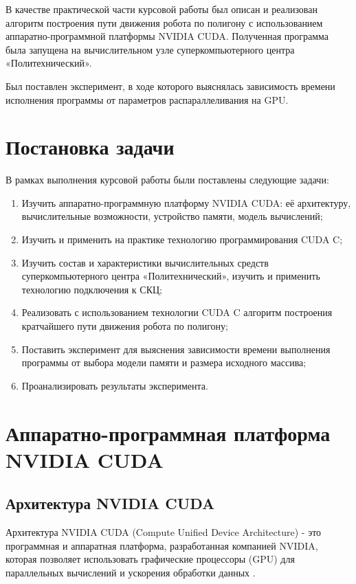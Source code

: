 \documentclass[a4paper, 12pt]{article}
\begin{document}
    В качестве практической части курсовой работы был описан и реализован алгоритм построения пути движения робота по полигону с использованием аппаратно-программной платформы NVIDIA CUDA. Полученная программа была запущена на вычислительном узле суперкомпьютерного центра «Политехнический».
    
    Был поставлен эксперимент, в ходе которого выяснялась зависимость времени
    исполнения программы от параметров распараллеливания на GPU.

    \clearpage
    \section{Постановка задачи}
    В рамках выполнения курсовой работы были поставлены следующие задачи:
    \begin{enumerate}
        \item Изучить аппаратно-программную платформу NVIDIA CUDA: её архитектуру, вычислительные возможности, устройство памяти, модель вычислений;
        \item Изучить и применить на практике технологию программирования CUDA C;
        \item Изучить состав и характеристики вычислительных средств суперкомпьютерного центра «Политехнический», изучить и применить технологию подключения к СКЦ;
        \item Реализовать с использованием технологии CUDA C алгоритм построения кратчайшего пути движения робота по полигону;
        \item Поставить эксперимент для выяснения зависимости времени выполнения программы от выбора модели памяти и размера исходного массива;
        \item Проанализировать результаты эксперимента.
    \end{enumerate}

    \newpage
    \section{Аппаратно-программная платформа NVIDIA CUDA}
    \subsection{Архитектура NVIDIA CUDA}
    Архитектура NVIDIA CUDA (Compute Unified Device Architecture) - это программная и аппаратная платформа, разработанная компанией NVIDIA, которая позволяет использовать графические процессоры (GPU) для параллельных вычислений и ускорения обработки данных \cite{cuda_tech}.
    
\end{document}
